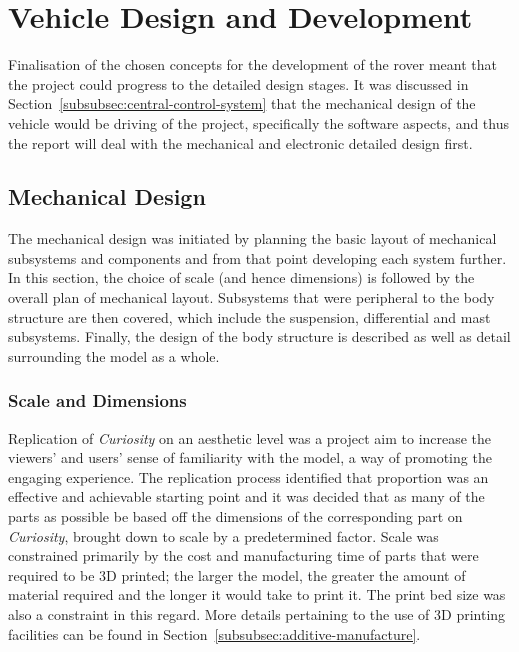 \section{Vehicle Design and Development}
  Finalisation of the chosen concepts for the development of the rover meant that the project could progress to the detailed design stages. It was discussed in Section~\ref{subsubsec:central-control-system} that the mechanical design of the vehicle would be driving of the project, specifically the software aspects, and thus the report will deal with the mechanical and electronic detailed design first.
  
  \subsection{Mechanical Design}
    The mechanical design was initiated by planning the basic layout of mechanical subsystems and components and from that point developing each system further. In this section, the choice of scale (and hence dimensions) is followed by the overall plan of mechanical layout. Subsystems that were peripheral to the body structure are then covered, which include the suspension, differential and mast subsystems. Finally, the design of the body structure is described as well as detail surrounding the model as a whole.
    
    \subsubsection{Scale and Dimensions}
      Replication of \textit{Curiosity} on an aesthetic level was a project aim to increase the viewers' and users' sense of familiarity with the model, a way of promoting the engaging experience. The replication process identified that proportion was an effective and achievable starting point and it was decided that as many of the parts as possible be based off the dimensions of the corresponding part on \textit{Curiosity}, brought down to scale by a predetermined factor. Scale was constrained primarily by the cost and manufacturing time of parts that were required to be 3D printed; the larger the model, the greater the amount of material required and the longer it would take to print it. The print bed size was also a constraint in this regard. More details pertaining to the use of 3D printing facilities can be found in Section~\ref{subsubsec:additive-manufacture}.
      
